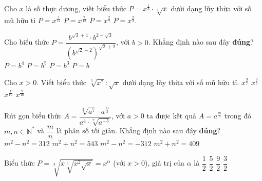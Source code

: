 \begin{ex}%
	 Cho $x$ là số thực dương, viết biểu thức $P=x^{\tfrac{1}{3}}\cdot \sqrt[4]{x}$ dưới dạng lũy thừa với số mũ hữu tỉ
	 \choice
		{$P=x^{\tfrac{1}{12}}$} 
		{\True $P=x^{\tfrac{7}{12}}$} 
		{$P=x^{\tfrac{2}{7}}$} 
		 {$P=x^{\tfrac{2}{3}}$.}
\end{ex}

\begin{ex}%
	 Cho biểu thức $P=\dfrac{b^{\sqrt 3+1}\cdot b^{2-\sqrt 3}}{\left(b^{\sqrt 2-2} \right)^{\sqrt 2+2}}$, với $b>0$. Khẳng định nào sau đây {\bf đúng}?
	 \choice
		 {$P=b^4$}
		{\True  $P=b^5$}
		 {$P=b^3$}
		 {$P=b$}
\end{ex}

\begin{ex}%
	Cho $x  > 0$. Viết biểu thức $\sqrt[5]{x^7}:\sqrt{x}$ dưới dạng lũy thừa với số mũ hữu tỉ.
	\choice 
		 {$x^{\tfrac{9}{7}}$}
		{$x^{\tfrac{9}{5}}$} 
		 {$x^{\tfrac{7}{10}}$}
		 {\True $x^{\tfrac{9}{10}}$}
\end{ex}

\begin{ex}%
	Rút gọn biểu thức $A=\dfrac{\sqrt[3]{a^7}\cdot a^{\frac{11}{3}}}{a^4\cdot\sqrt[7]{a^{-5}}}$, với $a>0$ ta được kết  quả $A=a^{\frac{m}{n}}$ trong đó $m,n\in\mathbb{N}^*$ và $\dfrac{m}{n}$ là phân số tối giản. Khẳng định nào sau đây \textbf{đúng}?
	 \choice
		{\True$m^2-n^2=312$} 
		{$m^2+n^2=543$} 
		{$m^2-n^2=-312$} 
		{$m^2+n^2=409$} 
\end{ex}

\begin{ex}%
	Biểu thức $P=\sqrt[{3}]{x\sqrt[{5}]{x^2  \sqrt{x}}}=x^{\alpha}$ (với $x > 0$), giá trị của $\alpha$ là
	\choice 
		{\True  $\dfrac{1}{2}$}
		 {$\dfrac{5}{2}$}
		 {$\dfrac{9}{2}$}
		{$\dfrac{3}{2}$} 
\end{ex}

